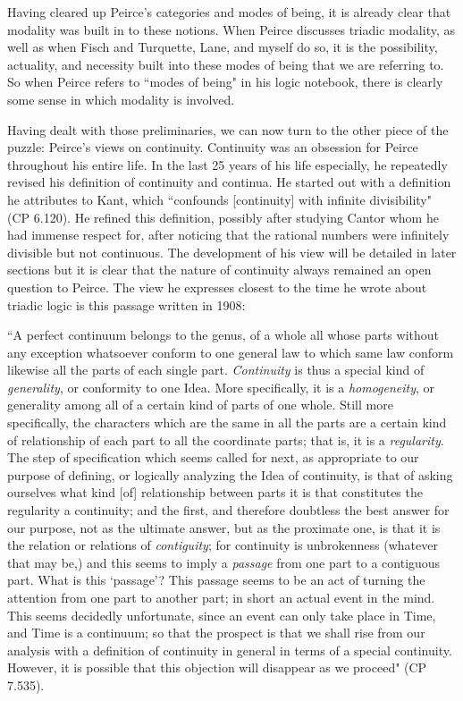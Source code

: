 \documentclass[12pt]{article}
\begin{document}
Having cleared up Peirce's categories and modes of being, it is already clear that modality was built in to these notions. When Peirce discusses triadic modality, as well as when Fisch and Turquette, Lane, and myself do so, it is the possibility, actuality, and necessity built into these modes of being that we are referring to. So when Peirce refers to ``modes of being" in his logic notebook, there is clearly some sense in which modality is involved.

Having dealt with those preliminaries, we can now turn to the other piece of the puzzle: Peirce's views on continuity. Continuity was an obsession for Peirce throughout his entire life. In the last 25 years of his life especially, he repeatedly revised his definition of continuity and continua. He started out with a definition he attributes to Kant, which ``confounds [continuity] with infinite divisibility" (CP 6.120). He refined this definition, possibly after studying Cantor whom he had immense respect for, after noticing that the rational numbers were infinitely divisible but not continuous. The development of his view will be detailed in later sections but it is clear that the nature of continuity always remained an open question to Peirce. The view he expresses closest to the time he wrote about triadic logic is this passage written in 1908:
\begin{singlespace}
``A perfect continuum belongs to the genus, of a whole all whose parts without any exception whatsoever conform to one general law to which same law conform likewise all the parts of each single part. \textit{Continuity} is thus a special kind of \textit{generality}, or conformity to one Idea. More specifically, it is a \textit{homogeneity}, or generality among all of a certain kind of parts of one whole. Still more specifically, the characters which are the same in all the parts are a certain kind of relationship of each part to all the coordinate parts; that is, it is a \textit{regularity}. The step of specification which seems called for next, as appropriate to our purpose of defining, or logically analyzing the Idea of continuity, is that of asking ourselves what kind [of] relationship between parts it is that constitutes the regularity a continuity; and the first, and therefore doubtless the best answer for our purpose, not as the ultimate answer, but as the proximate one, is that it is the relation or relations of \textit{contiguity}; for continuity is unbrokenness (whatever that may be,) and this seems to imply a \textit{passage} from one part to a contiguous part. What is this ‘passage’? This passage seems to be an act of turning the attention from one part to another part; in short an actual event in the mind. This seems decidedly unfortunate, since an event can only take place in Time, and Time is a continuum; so that the prospect is that we shall rise from our analysis with a definition of continuity in general in terms of a special continuity. However, it is possible that this objection will disappear as we proceed" (CP 7.535).
\end{singlespace}
\end{document}
